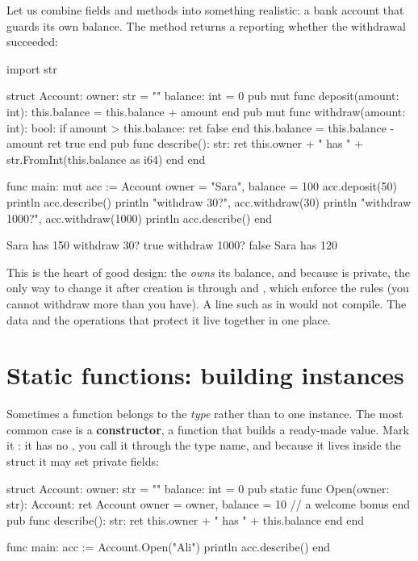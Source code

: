 Let us combine fields and methods into something realistic: a bank account that
guards its own balance. The  method returns a  reporting
whether the withdrawal succeeded:

\begin{salamen}
import str

struct Account:
    owner: str = ""
    balance: int = 0
    pub mut func deposit(amount: int):
        this.balance = this.balance + amount
    end
    pub mut func withdraw(amount: int): bool:
        if amount > this.balance:
            ret false
        end
        this.balance = this.balance - amount
        ret true
    end
    pub func describe(): str:
        ret this.owner + " has " + str.FromInt(this.balance as i64)
    end
end

func main:
    mut acc := Account { owner = "Sara", balance = 100 }
    acc.deposit(50)
    println acc.describe()
    println "withdraw 30?", acc.withdraw(30)
    println "withdraw 1000?", acc.withdraw(1000)
    println acc.describe()
end
\end{salamen}

\begin{progout}
Sara has 150
withdraw 30? true
withdraw 1000? false
Sara has 120
\end{progout}

This is the heart of good design: the  \emph{owns} its balance, and
because  is private, the only way to change it after creation is
through  and , which enforce the rules (you cannot
withdraw more than you have). A line such as  in
 would not compile. The data and the operations that protect it live
together in one place.

\section{Static functions: building instances}

Sometimes a function belongs to the \emph{type} rather than to one instance. The
most common case is a \textbf{constructor}, a function that builds a ready-made
value. Mark it : it has no , you call it through
the type name, and because it lives inside the struct it may set private fields:

\begin{salamen}
struct Account:
    owner: str = ""
    balance: int = 0
    pub static func Open(owner: str): Account:
        ret Account { owner = owner, balance = 10 }   // a welcome bonus
    end
    pub func describe(): str:
        ret this.owner + " has " + this.balance
    end
end

func main:
    acc := Account.Open("Ali")
    println acc.describe()
end
\end{salamen}

